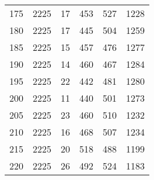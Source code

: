 \begin{longtable}{|l|l|l|l|l|l|}
175 & 2225 & 17 & 453 & 527 & 1228 \\
180 & 2225 & 17 & 445 & 504 & 1259 \\
185 & 2225 & 15 & 457 & 476 & 1277 \\
190 & 2225 & 14 & 460 & 467 & 1284 \\
195 & 2225 & 22 & 442 & 481 & 1280 \\
200 & 2225 & 11 & 440 & 501 & 1273 \\
205 & 2225 & 23 & 460 & 510 & 1232 \\
210 & 2225 & 16 & 468 & 507 & 1234 \\
215 & 2225 & 20 & 518 & 488 & 1199 \\
220 & 2225 & 26 & 492 & 524 & 1183 \\
	
	\bottomrule
\end{longtable}




